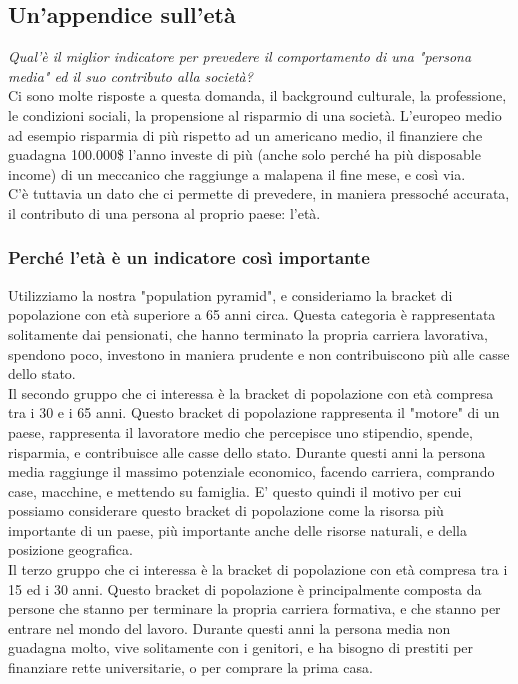 \documentclass[11pt, oneside]{article}
\begin{document}
\subsection{Un'appendice sull'età}
\emph{Qual'è il miglior indicatore per prevedere il comportamento di una "persona media" ed il suo contributo alla società?}\\
Ci sono molte risposte a questa domanda, il background culturale, la professione, le condizioni sociali, la propensione al risparmio di una società. L'europeo medio ad esempio risparmia di più rispetto ad un americano medio, il finanziere che guadagna 100.000\$ l'anno investe di più (anche solo perché ha più disposable income) di un meccanico che raggiunge a malapena il fine mese, e così via.\\
C'è tuttavia un dato che ci permette di prevedere, in maniera pressoché accurata, il contributo di una persona al proprio paese: l'età.

\subsubsection{Perché l'età è un indicatore così importante}
Utilizziamo la nostra "population pyramid", e consideriamo la bracket di popolazione con età superiore a 65 anni circa. Questa categoria è rappresentata solitamente dai pensionati, che hanno terminato la propria carriera lavorativa, spendono poco, investono in maniera prudente e non contribuiscono più alle casse dello stato. \\

Il secondo gruppo che ci interessa è la bracket di popolazione con età compresa tra i 30 e i 65 anni. Questo bracket di popolazione rappresenta il "motore" di un paese, rappresenta il lavoratore medio che percepisce uno stipendio, spende, risparmia, e contribuisce alle casse dello stato. Durante questi anni la persona media raggiunge il massimo potenziale economico, facendo carriera, comprando case, macchine, e mettendo su famiglia. E' questo quindi il motivo per cui possiamo considerare questo bracket di popolazione come la risorsa più importante di un paese, più importante anche delle risorse naturali, e della posizione geografica.\\

Il terzo gruppo che ci interessa è la bracket di popolazione con età compresa tra i 15 ed i 30 anni. Questo bracket di popolazione è principalmente composta da persone che stanno per terminare la propria carriera formativa, e che stanno per entrare nel mondo del lavoro.
Durante questi anni la persona media non guadagna molto, vive solitamente con i genitori, e ha bisogno di prestiti per finanziare rette universitarie, o per comprare la prima casa.\\
\end{document}
